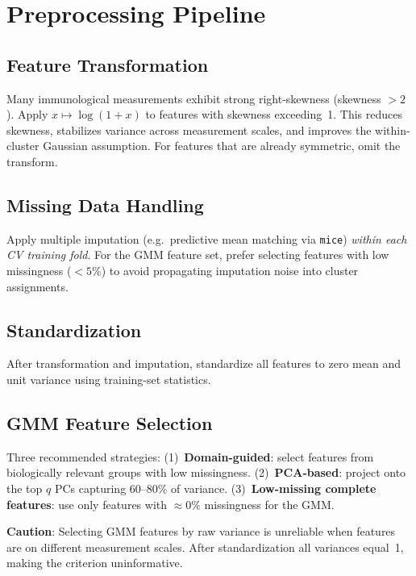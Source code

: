 \documentclass[11pt]{article}
\newenvironment{revblock}{\color{revcolor}}{}
\begin{document}
\begin{revblock}
\section{Preprocessing Pipeline}\label{sec:preprocess}

\subsection{Feature Transformation}
Many immunological measurements exhibit strong right-skewness (skewness ${>}2$). Apply $x \mapsto \log(1+x)$ to features with skewness exceeding~1. This reduces skewness, stabilizes variance across measurement scales, and improves the within-cluster Gaussian assumption. For features that are already symmetric, omit the transform.

\subsection{Missing Data Handling}
Apply multiple imputation (e.g.\ predictive mean matching via \texttt{mice}) \emph{within each CV training fold}. For the GMM feature set, prefer selecting features with low missingness (${<}5\%$) to avoid propagating imputation noise into cluster assignments.

\subsection{Standardization}
After transformation and imputation, standardize all features to zero mean and unit variance using training-set statistics.

\subsection{GMM Feature Selection}\label{sec:gmm-feat-sel}
Three recommended strategies: (1)~\textbf{Domain-guided}: select features from biologically relevant groups with low missingness. (2)~\textbf{PCA-based}: project onto the top $q$ PCs capturing 60--80\% of variance. (3)~\textbf{Low-missing complete features}: use only features with ${\approx}0\%$ missingness for the GMM.

\textbf{Caution}: Selecting GMM features by raw variance is unreliable when features are on different measurement scales. After standardization all variances equal~1, making the criterion uninformative.
\end{revblock}
\end{document}
